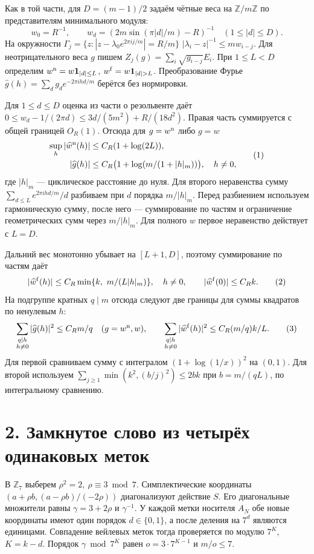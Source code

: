 \documentclass[11pt,a4paper]{article}
\newcommand{\Z}{\mathbb Z}
\newcommand{\sect}[1]{\section*{\sffamily\color{ink}#1}}
\begin{document}
Как в той части, для \(D=(m-1)/2\) задаём чётные веса на \(\Z/m\Z\) по представителям минимального модуля:
\[
 w_0=R^{-1},\qquad
 w_d=(2m\sin(\pi |d|/m)-R)^{-1}\quad(1\le |d|\le D).
\]
На окружности \(\Gamma_j=\{z:|z-\lambda_0 e^{2\pi i j/m}|=R/m\}\)
\(|\lambda_i-z|^{-1}\le m w_{i-j}\). Для неотрицательного веса \(g\) пишем \(Z_j(g)=\sum_i\sqrt{g_{i-j}}E_i\). При \(1\le L<D\) определим \(w^{\rm n}=w\mathbf1_{|d|\le L}\), \(w^{\rm f}=w\mathbf1_{|d|>L}\). Преобразование Фурье \(\widehat g(h)=\sum_d g_d e^{-2\pi i h d/m}\) берётся без нормировки.

Для \(1\le d\le D\) оценка из части о резольвенте даёт
\(0\le w_d-1/(2\pi d)\le 3d/(5m^2)+R/(18d^2)\). Правая часть суммируется с общей границей \(O_R(1)\). Отсюда для \(g=w^{\rm n}\) либо \(g=w\)
\begin{equation}
 \begin{split}
 \sup_h|\widehat w^{\rm n}(h)|&\le C_R(1+\log(2L)),\\
 |\widehat g(h)|&\le C_R\bigl(1+\log(m/(1+|h|_m))\bigr),\quad h\ne0 ,
 \end{split}                                                    \tag{1}
\end{equation}
где \(|h|_m\) --- циклическое расстояние до нуля. Для второго неравенства сумму \(\sum_{d\le L}e^{2\pi i hd/m}/d\) разбиваем при \(d\) порядка \(m/|h|_m\). Перед разбиением используем гармоническую сумму, после него --- суммирование по частям и ограничение геометрических сумм через \(m/|h|_m\). Для полного \(w\) первое неравенство действует с \(L=D\).

Дальний вес монотонно убывает на \([L+1,D]\), поэтому суммирование по частям даёт
\begin{equation}
 |\widehat w^{\rm f}(h)|\le C_R\min\{k,\ m/(L|h|_m)\},\quad h\ne0,
 \qquad |\widehat w^{\rm f}(0)|\le C_R k .                       \tag{2}
\end{equation}
На подгруппе кратных \(q\mid m\) отсюда следуют две границы для суммы квадратов по ненулевым \(h\):
\begin{equation}
 \sum_{\substack{q\mid h\\h\ne0}}|\widehat g(h)|^2\le C_Rm/q
             \quad(g=w^{\rm n},w),\qquad
 \sum_{\substack{q\mid h\\h\ne0}}|\widehat w^{\rm f}(h)|^2
                           \le C_R (m/q)k/L.                   \tag{3}
\end{equation}
Для первой сравниваем сумму с интегралом \((1+\log(1/x))^2\) на \((0,1)\). Для второй используем \(\sum_{j\ge1}\min(k^2,(b/j)^2)\le2bk\) при \(b=m/(qL)\), по интегральному сравнению.
\newpage
\sect{2. Замкнутое слово из четырёх одинаковых меток}
В \(\mathbb Z_7\) выберем \(\rho^2=2,\ \rho\equiv3\bmod7\). Симплектические координаты \((a+\rho b,(a-\rho b)/(-2\rho))\) диагонализуют действие \(S\). Его диагональные множители равны \(\gamma=3+2\rho\) и \(\gamma^{-1}\). У каждой метки носителя \(A_N\) обе новые координаты имеют один порядок \(d\in\{0,1\}\), а после деления на \(7^d\) являются единицами. Совпадение вейлевых меток тогда проверяется по модулю \(7^K\), \(K=k-d\). Порядок \(\gamma\bmod7^K\) равен \(o=3\cdot7^{K-1}\) и \(m/o\le7\).
\end{document}
